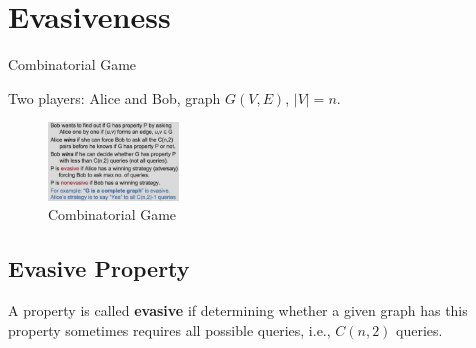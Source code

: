 \newpage
\section{Evasiveness}
Combinatorial Game

Two players: Alice and Bob, graph $G(V,E)$, $|V|=n$.

\begin{figure}[H]
    \centering
    \includegraphics[width=0.309\textwidth]{pic/DAA5/Combinatorial Game}
    \caption{Combinatorial Game}
\end{figure}

\subsection{Evasive Property}
\begin{definition}
    A property is called \textbf{evasive} if determining whether a given graph has this property sometimes requires all possible queries, i.e., $C(n,2)$ queries.
\end{definition}



